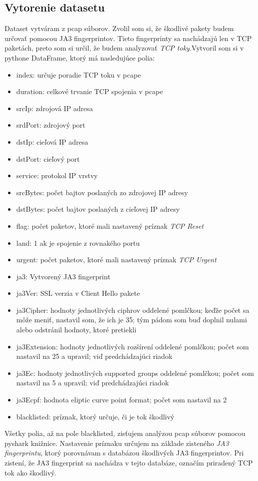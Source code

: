 \subsection{Vytorenie datasetu}
Dataset vytváram z pcap súborov. Zvolil som si, že škodlivé pakety budem určovať pomocou JA3 fingerprintov. Tieto fingerprinty sa nachádzajú len v TCP paketách, preto som si určil, že budem analyzovať \emph{TCP toky}.Vytvoril som si v pythone DataFrame, ktorý má nasledujúce polia:

\begin{itemize}
    \item index: určuje poradie TCP toku v pcape
    \item duration: celkové trvanie TCP spojenia v pcape
    \item srcIp: zdrojová IP adresa
    \item srdPort: zdrojový port
    \item dstIp: cieľová IP adresa
    \item dstPort: cieľový port
    \item service: protokol IP vrstvy
    \item srcBytes: počet bajtov poslaných zo zdrojovej IP adresy
    \item dstBytes: počet bajtov poslaných z cieľovej IP adresy
    \item flag: počet paketov, ktoré mali nastavený príznak \emph{TCP Reset}
    \item land: 1 ak je spojenie z rovnakého portu
    \item urgent: počet paketov, ktoré mali nastavený príznak \emph{TCP Urgent}
    \item ja3: Vytvorený JA3 fingerprint
    \item ja3Ver: SSL verzia v Client Hello pakete
    \item ja3Cipher: hodnoty jednotlivých ciphrov oddelené pomlčkou; keďže počet sa môže meniť, nastavil som, že ich je 35; tým pádom som buď doplnil nulami alebo odstránil hodnoty, ktoré pretiekli
    \item ja3Extension: hodnoty jednotlivých rozšírení oddelené pomlčkou; počet som nastavil na 25 a upravil; viď predchádzajúci riadok
    \item ja3Ec: hodnoty jednotlivých supported groups oddelené pomlčkou; počet som nastavil na 5 a upravil; viď predchádzajúci riadok
    \item ja3Ecpf:  hodnota eliptic curve point format; počet som nastavil na 2
    \item blacklisted: príznak, ktorý určuje, či je tok škodlivý
\end{itemize}
\cite{stolfo}\par
 Všetky polia, až na pole blacklisted,  zisťujem  analýzou pcap súborov pomocou pyshark knižnice. Nastavenie príznaku určujem na základe zisteného \emph{JA3
  fingerprintu}, ktorý porovnávam s databázou škodlivých JA3 fingerprintov. Pri zistení, že JA3 fingerprint sa nachádza v tejto databáze, označím priradený TCP tok ako škodlivý.
  
